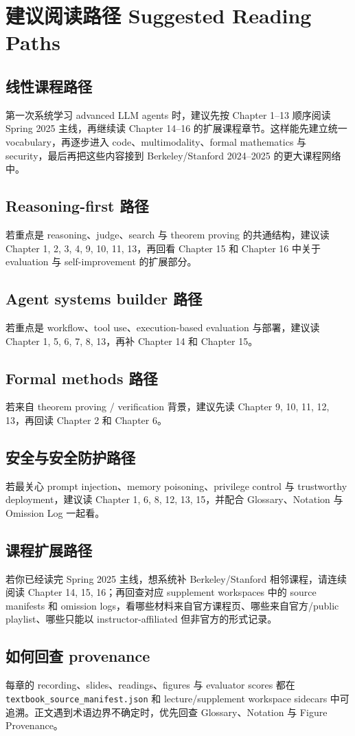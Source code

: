 \chapter{建议阅读路径 Suggested Reading Paths}
\section*{线性课程路径}
第一次系统学习 advanced LLM agents 时，建议先按 Chapter 1--13 顺序阅读 Spring 2025 主线，再继续读 Chapter 14--16 的扩展课程章节。这样能先建立统一 vocabulary，再逐步进入 code、multimodality、formal mathematics 与 security，最后再把这些内容接到 Berkeley/Stanford 2024--2025 的更大课程网络中。
\section*{Reasoning-first 路径}
若重点是 reasoning、judge、search 与 theorem proving 的共通结构，建议读 Chapter 1, 2, 3, 4, 9, 10, 11, 13，再回看 Chapter 15 和 Chapter 16 中关于 evaluation 与 self-improvement 的扩展部分。
\section*{Agent systems builder 路径}
若重点是 workflow、tool use、execution-based evaluation 与部署，建议读 Chapter 1, 5, 6, 7, 8, 13，再补 Chapter 14 和 Chapter 15。
\section*{Formal methods 路径}
若来自 theorem proving / verification 背景，建议先读 Chapter 9, 10, 11, 12, 13，再回读 Chapter 2 和 Chapter 6。
\section*{安全与安全防护路径}
若最关心 prompt injection、memory poisoning、privilege control 与 trustworthy deployment，建议读 Chapter 1, 6, 8, 12, 13, 15，并配合 Glossary、Notation 与 Omission Log 一起看。
\section*{课程扩展路径}
若你已经读完 Spring 2025 主线，想系统补 Berkeley/Stanford 相邻课程，请连续阅读 Chapter 14, 15, 16；再回查对应 supplement workspaces 中的 source manifests 和 omission logs，看哪些材料来自官方课程页、哪些来自官方/public playlist、哪些只能以 instructor-affiliated 但非官方的形式记录。
\section*{如何回查 provenance}
每章的 recording、slides、readings、figures 与 evaluator scores 都在 \texttt{textbook\_source\_manifest.json} 和 lecture/supplement workspace sidecars 中可追溯。正文遇到术语边界不确定时，优先回查 Glossary、Notation 与 Figure Provenance。
